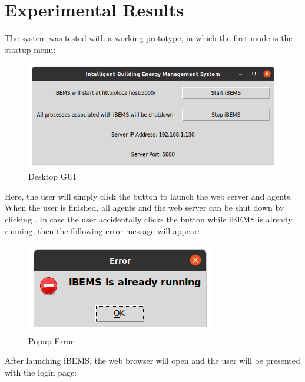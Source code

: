 \documentclass[conference]{IEEEtran}
\begin{document}
\section{Experimental Results}
\label{sec:iBEMS-Experimental Results}
The system was tested with a working prototype, in which the first mode is the startup menu:

\begin{figure}[htbp]
    \centering
    \includegraphics[scale=0.2]{figs/GUI/BEMS_GUI_Linux.png}
    \caption{Desktop GUI}
    \label{fig:desktopgui}
\end{figure}

\noindent
Here, the user will simply click the  button to launch the web server and agents. When the user is finished, all agents and the web server can be shut down by clicking . In case the user accidentally clicks the  button while iBEMS is already running, then the following error message will appear:

\begin{figure}[htbp]
    \centering
    \includegraphics[scale=0.3]{figs/GUI/BEMS_GUI_Linux_Warning.png}
    \caption{Popup Error}
    \label{fig:popuperror}
\end{figure}

\noindent
After launching iBEMS, the web browser will open and the user will be presented with the login page:
\end{document}
